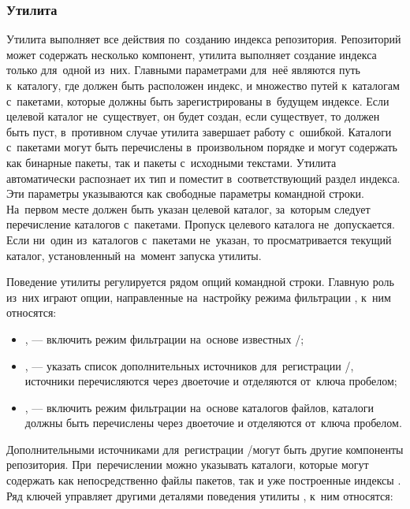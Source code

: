 \subsubsection{Утилита }

Утилита  выполняет все действия по~созданию индекса репозитория.
Репозиторий может содержать несколько компонент, утилита  выполняет создание индекса только для~одной из~них.
Главными параметрами для~неё являются путь к~каталогу, где должен быть расположен индекс,
и множество путей к~каталогам с~пакетами, которые должны быть зарегистрированы в~будущем индексе.
Если целевой каталог не~существует, он будет создан, 
если существует, то должен быть пуст, в~противном случае утилита завершает работу с~ошибкой. 
Каталоги с~пакетами могут быть перечислены в~произвольном порядке и могут содержать как бинарные пакеты, так и пакеты  с~исходными текстами.
Утилита  автоматически распознает их тип и поместит в~соответствующий раздел индекса.
Эти параметры указываются как свободные параметры командной строки.
На~первом месте должен быть указан целевой каталог, за~которым следует перечисление каталогов с~пакетами.
Пропуск целевого каталога не~допускается. 
Если ни~один из~каталогов с~пакетами не~указан, то просматривается текущий каталог, установленный на~момент запуска утилиты.

Поведение утилиты регулируется рядом опций командной строки.
Главную роль из~них играют опции, направленные на~настройку режима фильтрации \provides, к~ним относятся:

\begin{itemize}

\item{
,  --- включить режим фильтрации \provides на~основе известных \requires/\conflicts; %
}

\item {
,  --- указать список дополнительных источников для~регистрации \requires/\conflicts, 
источники перечисляются через двоеточие и отделяются от~ключа пробелом;
}

\item {
,  --- включить режим фильтрации \provides на~основе каталогов файлов,
каталоги должны быть перечислены через двоеточие и отделяются от~ключа пробелом.
}

\end{itemize}

Дополнительными источниками  для~регистрации \requires/\conflicts могут быть другие компоненты репозитория.
При~перечислении можно указывать каталоги, которые могут содержать как непосредственно файлы пакетов, так и уже построенные индексы \ds.
Ряд ключей управляет другими деталями поведения утилиты , к~ним относятся:

